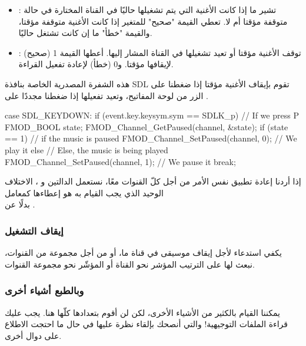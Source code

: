 \begin{itemize}
	\item {}:
	تشير ما إذا كانت الأغنية التي يتم تشغيلها حاليًا في القناة المختارة في حالة متوقفة مؤقتا أم لا. تعطي القيمة "صحيح" للمتغير 
	إذا كانت الأغنية متوقفة مؤقتا، والقيمة "خطأ" ما إن كانت تشتغل حاليًا.
	\item {}:
	توقف الأغنية مؤقتا أو تعيد تشغيلها في القناة المشار إليها. أعطها القيمة 1 (صحيح) لإيقافها مؤقتا. و0 (خطأ) لإعادة تفعيل القراءة.
\end{itemize}

هذه الشفرة المصدرية الخاصة بنافذة
\textenglish{SDL}
تقوم بإيقاف الأغنية مؤقتا إذا ضغطنا على الزر
من لوحة المفاتيح، وتعيد تفعيلها إذا ضغطنا مجددًا على
.

\begin{Csource}
case SDL_KEYDOWN:
if (event.key.keysym.sym == SDLK_p) // If we press P
{
	FMOD_BOOL state;
	FMOD_Channel_GetPaused(channel, &state);
	if (state == 1) // if the music is paused
		FMOD_Channel_SetPaused(channel, 0); // We play it
	else // Else, the music is being played
		FMOD_Channel_SetPaused(channel, 1); // We pause it
}
break;
\end{Csource}

 إذا أردنا إعادة تطبيق نفس الأمر من أجل كلّ القنوات معًا، نستعمل الدالتين
 و
،
الاختلاف الوحيد الذي يجب القيام به هو إعطاءها كمعامل\\
بدلًا عن 
.

\subsubsection{إيقاف التشغيل}

يكفي استدعاء
لأجل إيقاف موسيقى في قناة ما، أو
من أجل مجموعة من القنوات، نبعث لها على الترتيب المؤشر نحو القناة أو المؤشّر نحو مجموعة القنوات.

\subsubsection{وبالطبع أشياء أخرى}

يمكننا القيام بالكثير من الأشياء الأخرى، لكن لن أقوم بتعدادها كلّها هنا. يجب عليك قراءة الملفات التوجيهية! والتي أنصحك بإلقاء نظرة عليها في حال ما احتجت الاطلاع على دوال أخرى.

